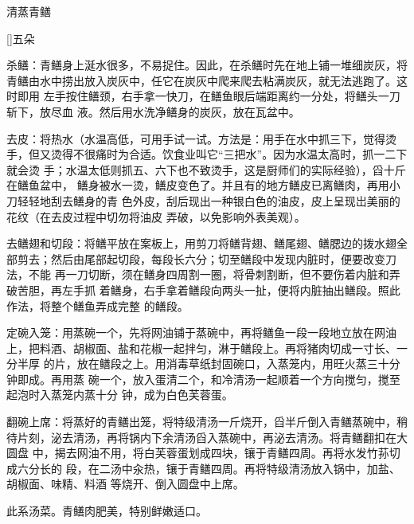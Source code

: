 \begin{recipe}{清蒸青鳝}

\ingredients

[\footnotemark]{五朵}

\preparation

\step 杀鳝：青鳝身上涎水很多，不易捉住。因此，在杀鳝时先在地上铺一堆细炭灰，将
青鳝由水中捞出放入炭灰中，任它在炭灰中爬来爬去粘满炭灰，就无法逃跑了。这时即用
左手按住鳝颈，右手拿一快刀，在鳝鱼眼后端距离约一分处，将鳝头一刀斩下，放尽血
液。然后用水洗净鳝身的炭灰，放在瓦盆中。

\step 去皮：将热水（水温高低，可用手试一试。方法是：用手在水中抓三下，觉得烫
手，但又烫得不很痛时为合适。饮食业叫它“三把水”。因为水温太高时，抓一二下就会烫
手；水温太低则抓五、六下也不致烫手，这是厨师们的实际经验），舀十斤在鳝鱼盆中，
鳝身被水一烫，鳝皮变色了。并且有的地方鳝皮已离鳝肉，再用小刀轻轻地刮去鳝身的青
色外皮，刮后现出一种银白色的油皮，皮上呈现岀美丽的花纹（在去皮过程中切勿将油皮
弄破，以免影响外表美观）。

\step 去鳝翅和切段：将鳝平放在案板上，用剪刀将鳝背翅、鳝尾翅、鳝腮边的拨水翅全
部剪去；然后由尾部起切段，每段长六分；切至鳝段中发现内脏时，便要改变刀法，不能
再一刀切断，须在鳝身四周割一圈，将骨刺割断，但不要伤着内脏和弄破苦胆，再左手抓
着鳝身，右手拿着鳝段向两头一扯，便将内脏抽出鳝段。照此作法，将整个鳝鱼弄成完整
的鳝段。

\step 定碗入笼：用蒸碗一个，先将网油铺于蒸碗中，再将鳝鱼一段一段地立放在网油
上，把料酒、胡椒面、盐和花椒一起拌匀，淋于鳝段上。再将猪肉切成一寸长、一分半厚
的片，放在鳝段之上。用消毒草纸封固碗口，入蒸笼内，用旺火蒸三十分钟即成。再用蒸
碗一个，放入蛋清二个，和冷清汤一起顺着一个方向搅匀，搅至起泡时入蒸笼内蒸十分
钟，成为白色芙蓉蛋。

\step 翻碗上席：将蒸好的青鳝出笼，将特级清汤一斤烧开，舀半斤倒入青鳝蒸碗中，稍
待片刻，泌去清汤，再将锅内下余清汤舀入蒸碗中，再泌去清汤。将青鳝翻扣在大圆盘
中，揭去网油不用，将白芙蓉蛋划成四块，镶于青鳝四周。再将水发竹荪切成六分长的
段，在二汤中汆热，镶于青鳝四周。再将特级清汤放入锅中，加盐、胡椒面、味精、料酒
等烧开、倒入圆盘中上席。

\features

此系汤菜。青鳝肉肥美，特别鲜嫩适口。


\end{recipe}

